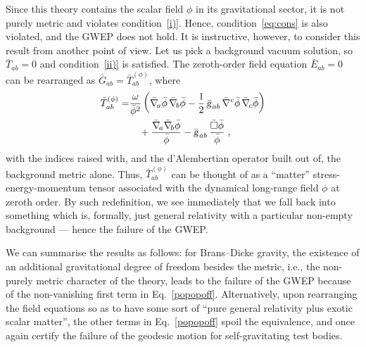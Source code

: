 \documentclass[a4paper,showkeys,aps,prd,reprint,nofootinbib,showpacs,twocolumn]{revtex4-1}
\newcommand{\ton}[1]{\left(#1\right)}
\newcommand{\eq}[1]{\( #1 \)}
\newcommand{\speq}[1]{\begin{equation}\begin{split}#1\end{split}\end{equation}}
\newcommand{\matg}{\text{\textsl{g}}}%
\theoremstyle{plain}
\begin{document}
Since this theory contains the scalar field \eq{\phi} in its gravitational sector, it is not purely metric and violates condition~\eqref{i)}.  Hence, condition~\eqref{eq:cons} is also violated, and the GWEP does not hold.  It is instructive, however, to consider this result from another point of view.  Let us pick a background vacuum solution, so \eq{\bar{T}_{ab} = 0} and condition~\eqref{ii)} is satisfied.  The zeroth-order field equation \eq{\bar{E}_{ab} = 0} can be rearranged as \eq{\bar{G}_{ab} = \bar{T}^{(\phi)}_{ab}},  where 
%
\speq{\bar{T}^{(\phi)}_{ab} = &\frac{\omega}{\bar{\phi}^2} \ton{\bar{\nabla}_{\! a} \bar{\phi} \, \bar{\nabla}_{\! b} \bar{\phi} - \frac{1}{2} \, \bar{\matg}_{ab} \, \bar{\nabla}^{c} \bar{\phi} \, \bar{\nabla}_{\! c} \bar{\phi}} \\
&\quad+ \frac{\bar{\nabla}_{\! a} \bar{\nabla}_{\! b} \bar{\phi}}{\bar{\phi}} - \bar{\matg}_{ab} \, \frac{\bar{\square} \bar{\phi}}{\bar{\phi}}\;,
\label{eq:einstbd}}
%
with the indices raised with, and the d'Alembertian operator built out of, the background metric alone.  Thus, \eq{\bar{T}^{(\phi)}_{ab}} can be thought of as a ``matter'' stress-energy-momentum tensor associated with the dynamical long-range field \eq{\phi} at zeroth order.  By such redefinition, we see immediately that we fall back into something which is, formally, just general relativity with a particular non-empty background --- hence the failure of the GWEP.

We can summarise the results as follows: for Brans--Dicke gravity, the existence of an additional gravitational degree of freedom besides the metric, i.e., the non-purely metric character of the theory, leads to the failure of the GWEP because of the non-vanishing first term in Eq.~\eqref{popopoff}. Alternatively, upon rearranging the field equations so as to have some sort of ``pure general relativity plus exotic scalar matter'', the other terms in Eq.~\eqref{popopoff} spoil the equivalence, and once again certify the failure of the geodesic motion for self-gravitating test bodies.
\end{document}
